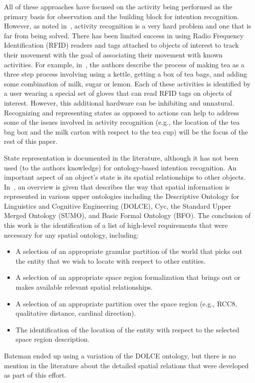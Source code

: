 \documentclass[final,1p,times]{elsarticle}
\begin{document}
All of these approaches have focused on the activity being performed as the primary basis for observation and the building block for intention recognition. However, as noted in~\cite{SADRI.2011}, activity recognition is a very hard problem and one that is far from being solved. There has been limited success in using Radio Frequency Identification (RFID) readers and tags attached to objects of interest to track their movement with the goal of associating their movement with known activities. For example, in~\cite{Philipose.PC.2004}, the authors describe the process of making tea as a three step process involving using a kettle, getting a box of tea bags, and adding some combination of milk, sugar or lemon. Each of these activities is identified by a user wearing a special set of gloves that can read RFID tags on objects of interest. However, this additional hardware can be inhibiting and unnatural.  Recognizing and representing states as opposed to actions can help to address some of the issues involved in activity recognition (e.g., the location of the tea bag box and the milk carton with respect to the tea cup) will be the focus of the rest of this paper.


State representation is documented in the literature, although it has not been used (to the authors knowledge) for ontology-based intention recognition. An important aspect of an object's state is its spatial relationships to other objects. In~\cite{Bateman.2006}, an overview is given that describes the way that spatial information is represented in various upper ontologies including the Descriptive Ontology for Linguistics and Cognitive Engineering (DOLCE), Cyc, the Standard Upper Merged Ontology (SUMO), and Basic Formal Ontology (BFO). The conclusion of this work is the identification of a list of high-level requirements that were necessary for any spatial ontology, including:

\begin{itemize}
\item A selection of an appropriate granular partition of the world that picks out the entity that we wish to locate with respect to other entities.
\item A selection of an appropriate space region formalization that brings out or makes available relevant spatial relationships.
\item A selection of an appropriate partition over the space region (e.g., RCC8, qualitative distance, cardinal direction).
\item The identification of the location of the entity with respect to the selected space region description.
\end{itemize}
Bateman ended up using a variation of the DOLCE ontology, but there is no mention in the literature about the detailed spatial relations that were developed as part of this effort.
\end{document}
